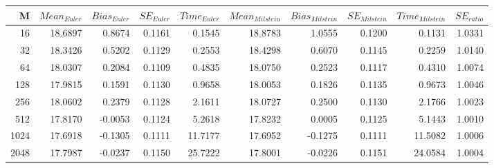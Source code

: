 \begin{tabular}{rrrrrrrrrr}
\toprule
M & $Mean_{Euler}$ & $Bias_{Euler}$ & $SE_{Euler}$ & $Time_{Euler}$ & $Mean_{Milstein}$ & $Bias_{Milstein}$ & $SE_{Milstein}$ & $Time_{Milstein}$ & $SE_{ratio}$ \\
\midrule
16 & 18.6897 & 0.8674 & 0.1161 & 0.1545 & 18.8783 & 1.0555 & 0.1200 & 0.1131 & 1.0331 \\
32 & 18.3426 & 0.5202 & 0.1129 & 0.2553 & 18.4298 & 0.6070 & 0.1145 & 0.2259 & 1.0140 \\
64 & 18.0307 & 0.2084 & 0.1109 & 0.4835 & 18.0750 & 0.2523 & 0.1117 & 0.4310 & 1.0074 \\
128 & 17.9815 & 0.1591 & 0.1130 & 0.9658 & 18.0053 & 0.1826 & 0.1135 & 0.9673 & 1.0046 \\
256 & 18.0602 & 0.2379 & 0.1128 & 2.1611 & 18.0727 & 0.2500 & 0.1130 & 2.1766 & 1.0023 \\
512 & 17.8170 & -0.0053 & 0.1124 & 5.2618 & 17.8232 & 0.0005 & 0.1125 & 5.1443 & 1.0010 \\
1024 & 17.6918 & -0.1305 & 0.1111 & 11.7177 & 17.6952 & -0.1275 & 0.1111 & 11.5082 & 1.0006 \\
2048 & 17.7987 & -0.0237 & 0.1150 & 25.7222 & 17.8001 & -0.0226 & 0.1151 & 24.0584 & 1.0004 \\
\bottomrule
\end{tabular}
